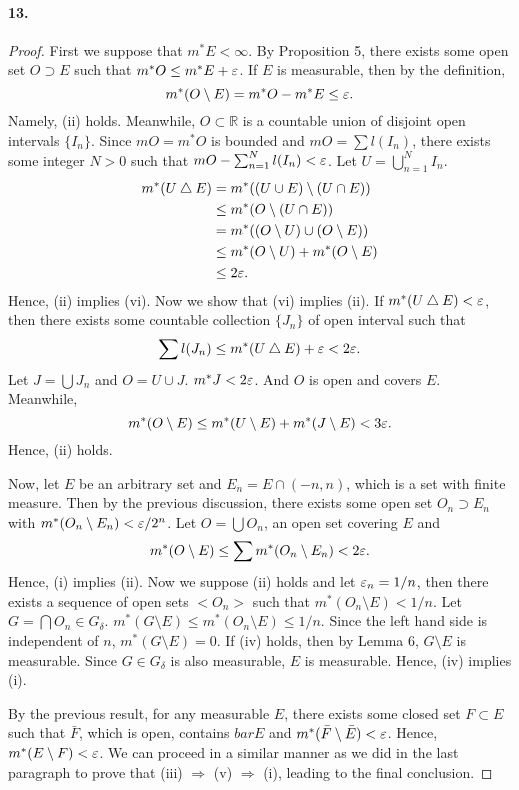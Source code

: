   \paragraph{13.}
  \begin{proof}
    First we suppose that $m^*E<\infty$. By Proposition 5, there exists some 
    open set $O\supset E$ such that $m^*O\le m^*E+\varepsilon$. If $E$ is measurable,
    then by the definition,
    \[
      m^*(O\setminus E) = m^*O-m^*E \le \varepsilon.
    \]
    Namely, (ii) holds. Meanwhile, $O\subset\mathbb{R}$ is a countable union of 
    disjoint open intervals $\{I_n\}$. Since $mO=m^*O$ is bounded and $mO=\sum
    l(I_n)$, there exists some integer $N>0$ such that $mO-\sum_{n=1}^N l(I_n)<
    \varepsilon$. Let $U=\bigcup_{n=1}^N I_n$.
    \begin{align*}
      m^*(U\bigtriangleup E) 
      &= m^*((U\cup E) \setminus (U\cap E)) \\
      & \le m^*(O\setminus (U\cap E))  \\
      & = m^*((O\setminus U) \cup (O\setminus E)) \\
      &\le m^*(O\setminus U) + m^*(O\setminus E)  \\
      &\le 2\varepsilon.
    \end{align*}
    Hence, (ii) implies (vi). Now we show that (vi) implies (ii). If $m^*(U
    \bigtriangleup E)<\varepsilon $, then there exists some countable collection $\{J_n
    \}$ of open interval such that 
    \[
      \sum l(J_n)\le m^*(U\bigtriangleup E)+\varepsilon<2\varepsilon.
    \]
    Let $J=\bigcup J_n$ and $O= U\cup J$. $m^*J < 2\varepsilon$. And $O$ is open and 
    covers $E$. Meanwhile,
    \[
      m^*(O\setminus E) \le m^*(U\setminus E)+m^*(J\setminus E) < 3\varepsilon.
    \]
    Hence, (ii) holds.\par
    Now, let $E$ be an arbitrary set and $E_n=E\cap(-n, n)$, which is a set with
    finite measure. Then by the previous discussion, there exists some open set
    $O_n\supset E_n$ with $m^*(O_n\setminus E_n)<\varepsilon/2^n$. Let $O=\bigcup 
    O_n$, an open set covering $E$ and
    \[
      m^*(O\setminus E) \le \sum m^*(O_n\setminus E_n) < 2\varepsilon. 
    \]
    Hence, (i) implies (ii). Now we suppose (ii) holds and let $\varepsilon_n=1/n$, 
    then there exists a sequence of open sets $<O_n>$ such that $m^*(O_n
    \setminus E)<1/n$. Let $G=\bigcap O_n\in G_\delta$. $m^*(G\setminus E)\le
    m^*(O_n\setminus E)\le 1/n$. Since the left hand side is independent of 
    $n$, $m^*(G\setminus E)=0$. If (iv) holds, then by Lemma 6, $G\setminus E$
    is measurable. Since $G\in G_\delta$ is also measurable, $E$ is measurable.
    Hence, (iv) implies (i).\par
    By the previous result, for any measurable $E$, there exists some closed set
    $F\subset E$ such that $\bar{F}$, which is open, contains $bar{E}$ and $m^*(
    \bar{F}\setminus \bar{E})<\varepsilon$. Hence, $m^*(E\setminus F)<\varepsilon$. We can 
    proceed in a similar manner as we did in the last paragraph to prove that
    (iii) $\Rightarrow$ (v) $\Rightarrow$ (i), leading to the final conclusion.
  \end{proof}

